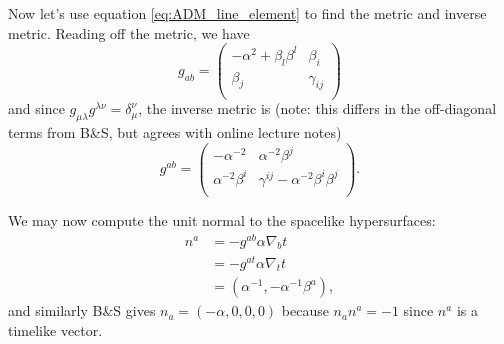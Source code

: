 \documentclass[12pt]{article}
\numberwithin{equation}{section}
\begin{document}
Now let's use equation \ref{eq:ADM_line_element} to find the metric and inverse metric.  Reading off the metric, we have
\begin{equation}
g_{ab} =
\begin{pmatrix}
-\alpha^{2} + \beta_l \beta^l & \beta_i \\
\beta_j & \gamma_{ij}  \\
\end{pmatrix}
\end{equation}
and since $g_{\mu \lambda} g^{\lambda \nu} = \delta^\nu_\mu$, the inverse metric is (note: this differs in the off-diagonal terms from B\&S, but agrees with online lecture notes)
\begin{equation}
g^{ab} = 
\begin{pmatrix}
-\alpha^{-2} & \alpha^{-2} \beta^j \\
\alpha^{-2} \beta^i & \gamma^{ij} - \alpha^{-2} \beta^{i} \beta^{j} \\
\end{pmatrix}.
\end{equation}

We may now compute the unit normal to the spacelike hypersurfaces:
\begin{equation}
\begin{aligned}
n^a &= -g^{ab} \alpha \nabla_b t \\
&= -g^{a t} \alpha \nabla_t t \\
&= (\alpha^{-1}, -\alpha^{-1} \beta^{a}),
\end{aligned}
\end{equation}
and similarly B\&S gives $n_a = (-\alpha, 0, 0, 0)$ because $n_a n^a = -1$ since $n^a$ is a timelike vector.
\end{document}
